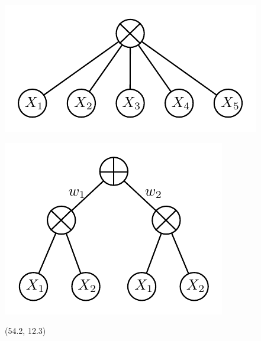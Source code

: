 \documentclass[final]{beamer}
\begin{document}
\begin{frame}{}
\begin{textblock}{25.7}
    
    \begin{minipage}{0.5\linewidth}
      \centering
      \includegraphics[width=0.65\linewidth]{figures/spn-prod}
    \end{minipage}\begin{minipage}{0.5\linewidth}
      \centering
      \includegraphics[width=0.55\linewidth]{figures/spn-sum}
    \end{minipage}
    
    
  \end{textblock}

  
  \begin{textblock}{25.7}(54.2, 12.3)
    \footnotesize
    \begin{minipage}{0.7\linewidth}
    

\end{minipage}
\end{textblock}
\end{frame}
\end{document}

